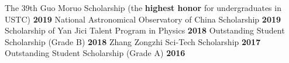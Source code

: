 
\begin{cventries}
  \cventry
    {}
    {The 39th Guo Moruo Scholarship \textnormal{(the \textbf{highest honor} for undergraduates in USTC)}}
    {\textcolor{awesome-emerald}{\textbf{2019}}}
    {}
    {}
\vspace{-0.7cm}
  \cventry
    {}
    {\textnormal{National Astronomical Observatory of China Scholarship}}
    {\textcolor{awesome-emerald}{\textbf{2019}}}
    {}
    {}
\vspace{-0.7cm}
  \cventry
    {}
    {\textnormal{Scholarship of Yan Jici Talent Program in Physics}}
    {\textcolor{awesome-emerald}{\textbf{2018}}}
    {}
    {}
\vspace{-0.7cm}
  \cventry
    {}
    {\textnormal{Outstanding Student Scholarship (Grade B)}}
    {\textcolor{awesome-emerald}{\textbf{2018}}}
    {}
    {}
\vspace{-0.7cm}
  \cventry
    {}
    {\textnormal{Zhang Zongzhi Sci-Tech Scholarship}}
    {\textcolor{awesome-emerald}{\textbf{2017}}}
    {}
    {}
\vspace{-0.7cm}
  \cventry
    {} %
    {\textnormal{Outstanding Student Scholarship (Grade A)}}
    {\textcolor{awesome-emerald}{\textbf{2016}}} %
    {} %
    {}
  \vspace{-1.2cm}
\end{cventries}